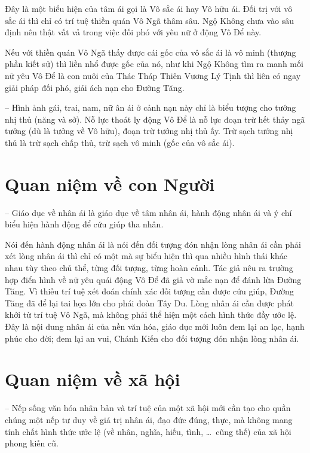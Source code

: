 Đây là một biểu hiện của tâm ái gọi là Vô sắc ái hay Vô hữu ái. Đối trị với vô sắc ái thì chỉ có trí tuệ thiền quán Vô Ngã thâm sâu. Ngộ Không chưa vào sâu định nên thật vất vả trong việc đối phó với yêu nữ ở động Vô Để này.

Nếu với thiền quán Vô Ngã thấy được cái gốc của vô sắc ái là vô minh (thượng phần kiết sử) thì liền nhổ được gốc của nó, như khi Ngộ Không tìm ra manh mối nữ yêu Vô Để là con nuôi của Thác Tháp Thiên Vương Lý Tịnh thì liên có ngay giải pháp đối phó, giải ách nạn cho Đường Tăng.

-- Hình ảnh gái, trai, nam, nữ ân ái ở cảnh nạn này chỉ là biểu tượng cho tướng nhị thủ (năng và sở). Nỗ lực thoát ly động Vô Để là nỗ lực đoạn trừ hết thảy ngã tưởng (dù là tưởng về Vô hữu), đoạn trừ tướng nhị thủ ấy. Trừ sạch tướng nhị thủ là trừ sạch chấp thủ, trừ sạch vô minh (gốc của vô sắc ái).

\section{Quan niệm về con Người} %
\label{sec:80_81_con_nguoi}

-- Giáo dục về nhân ái là giáo dục về tâm nhân ái, hành động nhân ái và ý chí biểu hiện hành động để cứu giúp tha nhân.

Nói đến hành động nhân ái là nói đến đối tượng đón nhận lòng nhân ái cần phải xét lòng nhân ái thì chỉ có một mà sự biểu hiện thì qua nhiều hình thái khác nhau tùy theo chủ thể, từng đối tượng, từng hoàn cảnh. Tác giả nêu ra trường hợp điển hình về nữ yêu quái động Vô Để đã giả vờ mắc nạn để đánh lừa Đường Tăng. Vì thiếu trí tuệ xét đoán chính xác đối tượng cần được cứu giúp, Đường Tăng đã để lại tai họa lớn cho phái đoàn Tây Du. Lòng nhân ái cần được phát khởi từ trí tuệ Vô Ngã, mà không phải thể hiện một cách hình thức đầy ước lệ. Đây là nội dung nhân ái của nền văn hóa, giáo dục mới luôn đem lại an lạc, hạnh phúc cho đời; đem lại an vui, Chánh Kiến cho đối tượng đón nhận lòng nhân ái.

\section{Quan niệm về xã hội} %
\label{sec:80_81_xa_hoi}

-- Nếp sống văn hóa nhân bản và trí tuệ của một xã hội mới cần tạo cho quần chúng một nếp tư duy về giá trị nhân ái, đạo đức đúng, thực, mà không mang tính chất hình thức ước lệ (về nhân, nghĩa, hiếu, tình, \ldots ~cũng thế) của xã hội phong kiến cũ.

